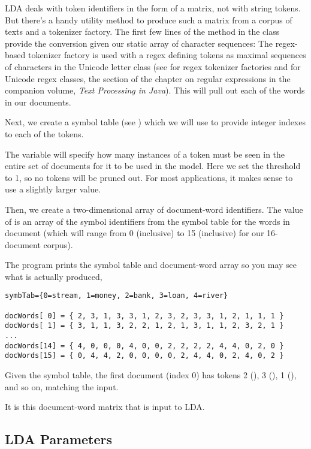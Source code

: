 LDA deals with token identifiers in the form of a matrix, not
with string tokens.  But there's a handy utility method to produce
such a matrix from a corpus of texts and a tokenizer factory.
The first few lines of the  method in
the  class provide the conversion
given our static array  of character sequences:
%
%
The regex-based tokenizer factory is used with a regex defining tokens
as maximal sequences of characters in the Unicode letter class (see
 for regex tokenizer factories and
for Unicode regex classes, the section of the chapter on regular
expressions in the companion volume, {\it Text Processing in Java}).
This will pull out each of the words in our documents.

Next, we create a symbol table (see )
which we will use to provide integer indexes to each of the tokens.

The variable  will specify how many instances of a
token must be seen in the entire set of documents for it to be used in
the model.  Here we set the threshold to 1, so no tokens will be
pruned out.  For most applications, it makes sense to use a slightly
larger value.

Then, we create a two-dimensional array of document-word identifiers.
The value of  is an array of the symbol identifiers
from the symbol table for the words in document  (which will
range from 0 (inclusive) to 15 (inclusive) for our 16-document
corpus).  

The program prints the symbol table and document-word array so
you may see what is actually produced,
%
\begin{verbatim}
symbTab={0=stream, 1=money, 2=bank, 3=loan, 4=river}

docWords[ 0] = { 2, 3, 1, 3, 3, 1, 2, 3, 2, 3, 3, 1, 2, 1, 1, 1 }
docWords[ 1] = { 3, 1, 1, 3, 2, 2, 1, 2, 1, 3, 1, 1, 2, 3, 2, 1 }
...
docWords[14] = { 4, 0, 0, 0, 4, 0, 0, 2, 2, 2, 2, 4, 4, 0, 2, 0 }
docWords[15] = { 0, 4, 4, 2, 0, 0, 0, 0, 2, 4, 4, 0, 2, 4, 0, 2 }
\end{verbatim}
%
Given the symbol table, the first document (index 0) has tokens 2
(), 3 (), 1
(), and so on, matching the input.  

It is this document-word matrix that is input to LDA.  

\subsection{LDA Parameters}

